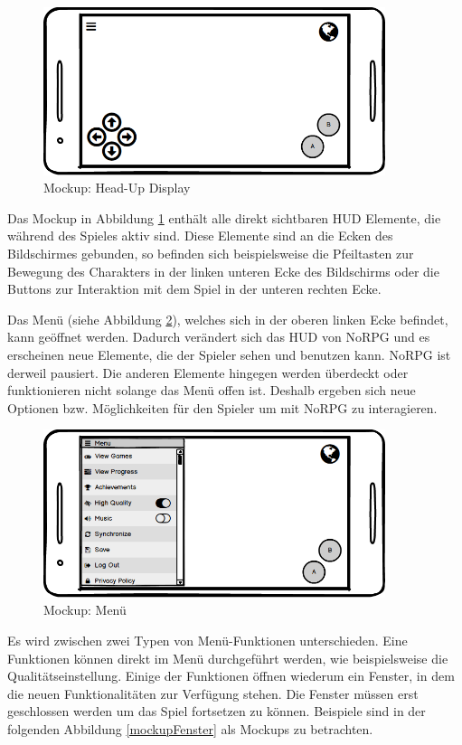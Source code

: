 			\begin{figure}[htbp]
				\centering 
				\label{mockupHUD}
				\includegraphics[width=10cm]{pics/HUD.png}
				\caption{Mockup: Head-Up Display}
			\end{figure}
			
			Das Mockup in Abbildung \ref{mockupHUD} enthält alle direkt sichtbaren HUD Elemente, die während des Spieles aktiv sind. Diese Elemente sind an die Ecken des Bildschirmes gebunden, so befinden sich beispielsweise die Pfeiltasten zur Bewegung des Charakters in der linken unteren Ecke des Bildschirms oder die Buttons zur Interaktion mit dem Spiel in der unteren rechten Ecke. 
			
			Das Menü (siehe Abbildung \ref{mockupMenu}), welches sich in der oberen linken Ecke befindet, kann geöffnet werden. Dadurch verändert sich das HUD von NoRPG und es erscheinen neue Elemente, die der Spieler sehen und benutzen kann. NoRPG ist derweil pausiert. Die anderen Elemente hingegen werden überdeckt oder funktionieren nicht solange das Menü offen ist. Deshalb ergeben sich neue Optionen bzw. Möglichkeiten für den Spieler um mit NoRPG zu interagieren.
			
			\begin{figure}[htbp]
				\centering 
				\label{mockupMenu}
				\includegraphics[width=10cm]{pics/Menu.png}
				\caption{Mockup: Menü}
			\end{figure}
			
			Es wird zwischen zwei Typen von Menü-Funktionen unterschieden. Eine Funktionen können direkt im Menü durchgeführt werden, wie beispielsweise die Qualitätseinstellung. Einige der Funktionen öffnen wiederum ein Fenster, in dem die neuen Funktionalitäten zur Verfügung stehen. Die Fenster müssen erst geschlossen werden um das Spiel fortsetzen zu können. Beispiele sind in der folgenden Abbildung \ref{mockupFenster} als Mockups zu betrachten.
			
